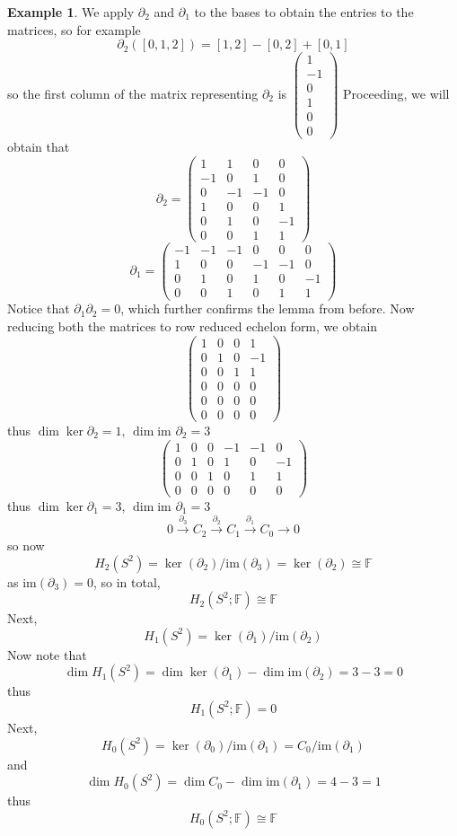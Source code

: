 \documentclass[a4paper,14pt]{extarticle}
\theoremstyle{definition}
\newtheorem*{eg}{Example}
\begin{document}
\begin{eg}
We apply $\partial_2$ and $\partial_1$ to the bases to obtain the entries to the matrices, so for example \[\partial_2([0,1,2])=[1,2]-[0,2]+[0,1]\] so the first column of the matrix representing 
$\partial_2$ is $\begin{pmatrix}1\\-1\\0\\1\\0\\0\end{pmatrix}$ Proceeding, we will obtain that
\[\partial_2=\begin{pmatrix}1&1&0&0\\-1&0&1&0\\0&-1&-1&0\\1&0&0&1\\0&1&0&-1\\0&0&1&1\end{pmatrix}\]
\[\partial_1=\begin{pmatrix}-1&-1&-1&0&0&0\\1&0&0&-1&-1&0\\0&1&0&1&0&-1\\0&0&1&0&1&1\end{pmatrix}\]
Notice that $\partial_1\partial_2=0$, which further confirms the lemma from before. Now reducing both the matrices to row reduced echelon form, we obtain
\[\begin{pmatrix}1&0&0&1\\0&1&0&-1\\0&0&1&1\\0&0&0&0\\0&0&0&0\\0&0&0&0\end{pmatrix}\] thus $\dim\ker\partial_2=1,\,\dim\text{im }\partial_2=3$
\[\begin{pmatrix}1&0&0&-1&-1&0\\0&1&0&1&0&-1\\0&0&1&0&1&1\\0&0&0&0&0&0\end{pmatrix}\] thus $\dim\ker\partial_1=3,\,\dim\text{im }\partial_1=3$
\[0\xrightarrow{\partial_3} C_2\xrightarrow{\partial_2}C_1\xrightarrow{\partial_1} C_0\rightarrow0\]
so now \[H_2(S^2)=\ker(\partial_2)/\text{im}(\partial_3)=\ker(\partial_2)\cong\mathbb{F}\] as $\text{im}(\partial_3)=0$, so in total, \[H_2(S^2;\mathbb{F})\cong\mathbb{F}\] Next,
\[H_1(S^2)=\ker(\partial_1)/\text{im}(\partial_2)\] Now note that \[\dim H_1(S^2)=\dim\ker(\partial_1)-\dim\text{im}(\partial_2)=3-3=0\] thus \[H_1(S^2;\mathbb{F})=0\] Next,
\[H_0(S^2)=\ker(\partial_0)/\text{im}(\partial_1)=C_0/\text{im}(\partial_1)\] and \[\dim H_0(S^2)=\dim C_0-\dim\text{im}(\partial_1)=4-3=1\] thus \[H_0(S^2;\mathbb{F})\cong\mathbb{F}\]
\end{eg}
\end{document}
